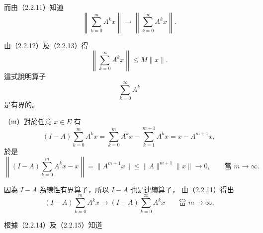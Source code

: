 \documentclass[11pt,a4paper,twoside]{article}
\newcommand{\pnum}[1]{%
    \makebox[0pt][r]{%
        \scriptsize\textbf{[#1]}\hspace{0.7em}%
    }%
}
\begin{document}
而由（2.2.11）知道
\begin{equation}
    \left\|
    \sum_{k=0}^{m}A^k x
    \right\|
    \longrightarrow
    \left\|
    \sum_{k=0}^{\infty}A^k x
    \right\|.
    \tag{2.2.13}
\end{equation}

由（2.2.12）及（2.2.13）得
\[
    \left\|
    \sum_{k=0}^{\infty}A^k x
    \right\|
    \le
    M\|x\|.
\]
這式說明算子
\[
    \sum_{k=0}^{\infty}A^k
\]
是有界的。

\noindent
\pnum{90}
（iii）對於任意 $x\in E$ 有
\[
    (I-A)\sum_{k=0}^{m}A^k x
    =
    \sum_{k=0}^{m}A^k x
    -
    \sum_{k=1}^{m+1}A^k x
    =
    x-A^{m+1}x,
\]
於是
\begin{equation}
    \left\|
    (I-A)\sum_{k=0}^{m}A^k x-x
    \right\|
    =
    \|A^{m+1}x\|
    \le
    \|A\|^{m+1}\|x\|
    \longrightarrow0,
    \qquad
    \text{當 }m\to\infty.
    \tag{2.2.14}
\end{equation}

因為 $I-A$ 為線性有界算子，所以 $I-A$ 也是連續算子，
由（2.2.11）得出
\begin{equation}
    (I-A)\sum_{k=0}^{m}A^k x
    \longrightarrow
    (I-A)\sum_{k=0}^{\infty}A^k x
    \qquad
    \text{當 }m\to\infty.
    \tag{2.2.15}
\end{equation}

根據（2.2.14）及（2.2.15）知道
\end{document}
